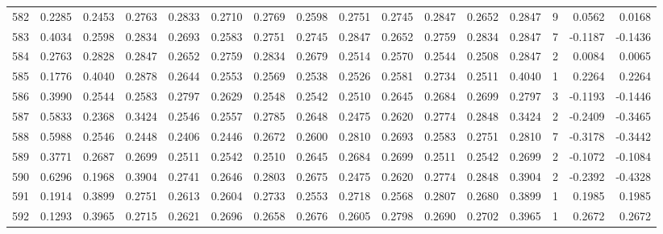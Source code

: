 \begin{tabular}{lrrrrrrrrrrrrrrr}
582 &      0.2285 &  0.2453 &  0.2763 &  0.2833 &  0.2710 &  0.2769 &  0.2598 &  0.2751 &  0.2745 &  0.2847 &   0.2652 &     0.2847 &      9 &                    0.0562 &                     0.0168 \\
583 &      0.4034 &  0.2598 &  0.2834 &  0.2693 &  0.2583 &  0.2751 &  0.2745 &  0.2847 &  0.2652 &  0.2759 &   0.2834 &     0.2847 &      7 &                   -0.1187 &                    -0.1436 \\
584 &      0.2763 &  0.2828 &  0.2847 &  0.2652 &  0.2759 &  0.2834 &  0.2679 &  0.2514 &  0.2570 &  0.2544 &   0.2508 &     0.2847 &      2 &                    0.0084 &                     0.0065 \\
585 &      0.1776 &  0.4040 &  0.2878 &  0.2644 &  0.2553 &  0.2569 &  0.2538 &  0.2526 &  0.2581 &  0.2734 &   0.2511 &     0.4040 &      1 &                    0.2264 &                     0.2264 \\
586 &      0.3990 &  0.2544 &  0.2583 &  0.2797 &  0.2629 &  0.2548 &  0.2542 &  0.2510 &  0.2645 &  0.2684 &   0.2699 &     0.2797 &      3 &                   -0.1193 &                    -0.1446 \\
587 &      0.5833 &  0.2368 &  0.3424 &  0.2546 &  0.2557 &  0.2785 &  0.2648 &  0.2475 &  0.2620 &  0.2774 &   0.2848 &     0.3424 &      2 &                   -0.2409 &                    -0.3465 \\
588 &      0.5988 &  0.2546 &  0.2448 &  0.2406 &  0.2446 &  0.2672 &  0.2600 &  0.2810 &  0.2693 &  0.2583 &   0.2751 &     0.2810 &      7 &                   -0.3178 &                    -0.3442 \\
589 &      0.3771 &  0.2687 &  0.2699 &  0.2511 &  0.2542 &  0.2510 &  0.2645 &  0.2684 &  0.2699 &  0.2511 &   0.2542 &     0.2699 &      2 &                   -0.1072 &                    -0.1084 \\
590 &      0.6296 &  0.1968 &  0.3904 &  0.2741 &  0.2646 &  0.2803 &  0.2675 &  0.2475 &  0.2620 &  0.2774 &   0.2848 &     0.3904 &      2 &                   -0.2392 &                    -0.4328 \\
591 &      0.1914 &  0.3899 &  0.2751 &  0.2613 &  0.2604 &  0.2733 &  0.2553 &  0.2718 &  0.2568 &  0.2807 &   0.2680 &     0.3899 &      1 &                    0.1985 &                     0.1985 \\
592 &      0.1293 &  0.3965 &  0.2715 &  0.2621 &  0.2696 &  0.2658 &  0.2676 &  0.2605 &  0.2798 &  0.2690 &   0.2702 &     0.3965 &      1 &                    0.2672 &                     0.2672 \\

\end{tabular}
